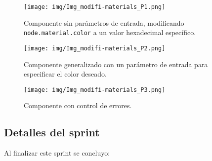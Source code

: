 \documentclass[a4paper, 12pt]{book}
\begin{document}
            \begin{figure}[H]
                \centering
                \texttt{[image: img/Img\_modifi-materials\_P1.png]}
                \caption{\footnotesize Componente sin parámetros de entrada, modificando \texttt{node.material.color} a un valor hexadecimal específico.}
                \label{fig:Img_modifi-materials_P1.png}
            \end{figure}
            \begin{figure}[H]
                \centering
                \begin{minipage}[t]{0.48\textwidth}
                    \centering
                    \texttt{[image: img/Img\_modifi-materials\_P2.png]}
                    \caption{\footnotesize Componente generalizado con un parámetro de entrada para especificar el color deseado.}
                    \label{fig:Img_modifi-materials_P2}
                \end{minipage}%
                \hfill
                \begin{minipage}[t]{0.48\textwidth}
                    \centering
                    \texttt{[image: img/Img\_modifi-materials\_P3.png]}
                    \caption{\footnotesize Componente con control de errores.}
                    \label{fig:Img_modifi-materials_P3}
                \end{minipage}
            \end{figure}

        
            \subsection{Detalles del sprint}
            
            Al finalizar este sprint se concluyo:
            
\end{document}
